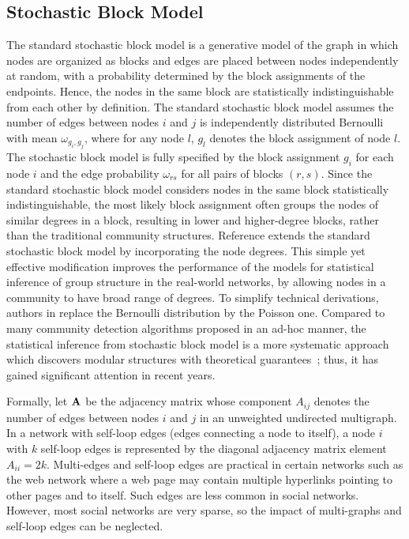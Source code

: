 \subsection{Stochastic Block Model} \label{sec:2.2.2}
The standard stochastic block model is a generative model of the graph in which nodes are organized as blocks and edges are placed between nodes independently at random, with a probability determined by the block assignments of the endpoints. Hence, the nodes in the same block are statistically indistinguishable from each other by definition. The standard stochastic block model assumes the number of edges between nodes $i$ and $j$ is independently distributed Bernoulli with mean $\omega_{g_i,g_j}$, where for any node $l$, $g_l$ denotes the block assignment of node $l$. The stochastic block model is fully specified by the block assignment $g_i$ for each node $i$ and the edge probability $\omega_{rs}$ for all pairs of blocks $(r,s)$. Since the standard stochastic block model considers nodes in the same block statistically indistinguishable, the most likely block assignment often groups the nodes of similar degrees in a block, resulting in lower and higher-degree blocks, rather than the traditional community structures. Reference \cite{karrer2011stochastic} extends the standard stochastic block model by incorporating the node degrees. This simple yet effective modification improves the performance of the models for statistical inference of group structure in the real-world networks, by allowing nodes in a community to have broad range of degrees. To simplify technical derivations, authors in \cite{karrer2011stochastic} replace the Bernoulli distribution by the Poisson one. Compared to many community detection algorithms proposed in an ad-hoc manner, the statistical inference from stochastic block model is a more systematic approach which discovers modular structures with theoretical guarantees~\cite{bickel2009nonparametric}; thus, it has gained significant attention in recent years.

Formally, let $\bf A$ be the adjacency matrix whose component $A_{ij}$ denotes the number of edges between nodes $i$ and $j$ in an unweighted undirected multigraph. In a network with self-loop edges (edges connecting a node to itself), a node $i$ with $k$ self-loop edges is represented by the diagonal adjacency matrix element $A_{ii} = 2k$. Multi-edges and self-loop edges are practical in certain networks such as the web network where a web page may contain multiple hyperlinks pointing to other pages and to itself. Such edges are less common in social networks. However, most social networks are very sparse, so the impact of multi-graphs and self-loop edges can be neglected.

